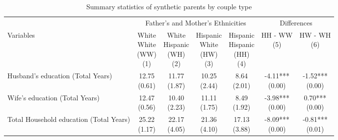 \begin{table}[t]
\caption{Summary statistics of synthetic parents by couple type \label{tab:synth}}
\begin{threeparttable}
\begin{tabular}[t]{>{\raggedright\arraybackslash}p{5cm}cccccc}
\toprule
\multicolumn{1}{c}{ } & \multicolumn{4}{c}{Father's and Mother's Ethnicities} & \multicolumn{2}{c}{Differences} \\
\cmidrule(l{3pt}r{3pt}){2-5} \cmidrule(l{3pt}r{3pt}){6-7}
Variables & \specialcell{White \\ White \\ (WW) \\ (1)} & \specialcell{White \\ Hispanic \\ (WH) \\ (2)} & \specialcell{Hispanic \\ White \\ (HW) \\ (3)} & \specialcell{Hispanic \\ Hispanic \\ (HH) \\ (4)} & \specialcell{HH - WW \\ (5)} & \specialcell{HW - WH \\ (6)}\\
\midrule
Husband's education (Total Years) & \specialcell{12.75\\(0.61)} & \specialcell{11.77\\(1.87)} & \specialcell{10.25\\(2.44)} & \specialcell{8.64\\(2.01)} & \specialcell{-4.11***\\(0.00)} & \specialcell{-1.52***\\(0.00)}\\
Wife's education (Total Years) & \specialcell{12.47\\(0.56)} & \specialcell{10.40\\(2.23)} & \specialcell{11.11\\(1.75)} & \specialcell{8.49\\(1.92)} & \specialcell{-3.98***\\(0.00)} & \specialcell{0.70***\\(0.00)}\\
Total Household education (Total Years) & \specialcell{25.22\\(1.17)} & \specialcell{22.17\\(4.05)} & \specialcell{21.36\\(4.10)} & \specialcell{17.13\\(3.88)} & \specialcell{-8.09***\\(0.00)} & \specialcell{-0.81***\\(0.01)}\\

\end{tabular}
\end{threeparttable}
\end{table}
